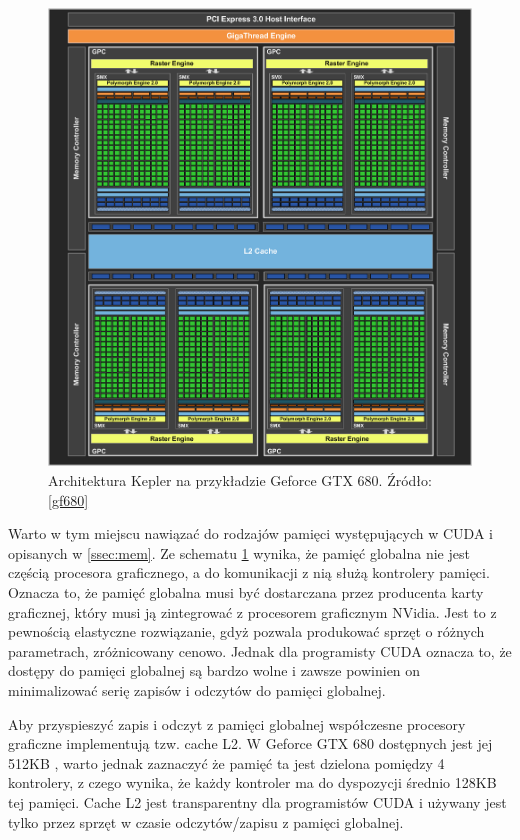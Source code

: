 \begin{figure}[H]
\centering
\includegraphics[scale=0.4]{images/kepler-overview.png}
\caption{Architektura Kepler na przykładzie Geforce GTX 680. Źródło: \ref{gf680}}
\label{hier}
\end{figure}

Warto w tym miejscu nawiązać do rodzajów pamięci występujących w CUDA i opisanych w \ref{ssec:mem}. 
Ze schematu \ref{hier} wynika, że pamięć globalna nie jest częścią procesora
graficznego, a do komunikacji z nią służą kontrolery pamięci. Oznacza to, że
pamięć globalna musi być dostarczana przez producenta karty graficznej,
	który musi ją zintegrować z procesorem graficznym NVidia. Jest to z
	pewnością elastyczne rozwiązanie, gdyż pozwala produkować sprzęt o różnych
	parametrach, zróżnicowany cenowo. Jednak dla programisty CUDA oznacza to, że
	dostępy do pamięci globalnej są bardzo wolne i
	zawsze powinien on minimalizować serię zapisów i odczytów do pamięci
	globalnej.

Aby przyspieszyć zapis i odczyt z pamięci globalnej współczesne procesory
graficzne implementują tzw. cache L2. W Geforce GTX 680 dostępnych jest jej 512KB
, warto jednak zaznaczyć że pamięć ta jest dzielona pomiędzy 4
kontrolery, z czego wynika, że każdy kontroler ma do dyspozycji średnio
128KB tej pamięci. Cache L2 jest transparentny dla programistów CUDA i używany
jest tylko przez sprzęt w czasie odczytów/zapisu z pamięci globalnej.

